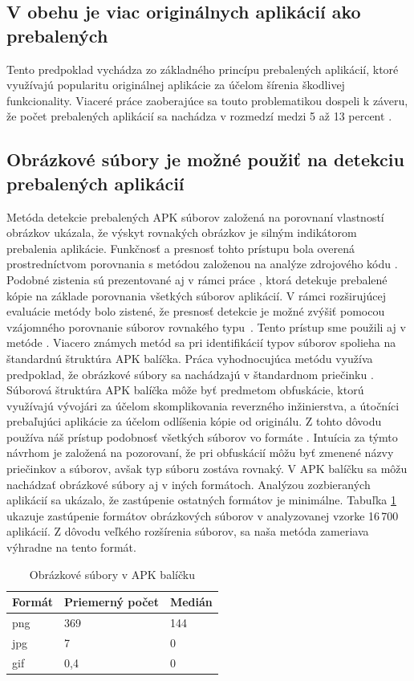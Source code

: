 \subsection*{V obehu je viac originálnych aplikácií ako prebalených}
Tento predpoklad vychádza zo základného princípu prebalených aplikácií, ktoré využívajú popularitu originálnej aplikácie za účelom šírenia škodlivej funkcionality. Viaceré práce zaoberajúce sa touto problematikou dospeli k záveru, že počet prebalených aplikácií sa nachádza v rozmedzí medzi 5 až 13 percent \cite{Zhou2012}.

\subsection*{Obrázkové súbory je možné použiť na detekciu prebalených aplikácií}
Metóda detekcie prebalených APK súborov  založená na porovnaní vlastností obrázkov ukázala, že výskyt rovnakých obrázkov je silným indikátorom prebalenia aplikácie. Funkčnosť a presnosť tohto prístupu bola overená prostredníctvom porovnania s metódou založenou na analýze zdrojového kódu \cite{ImageStruct}. Podobné zistenia sú prezentované aj v rámci práce , ktorá detekuje prebalené kópie na základe porovnania všetkých súborov aplikácií\cite{Zhauniarovich2014}. V rámci rozširujúcej evaluácie metódy  bolo zistené, že presnosť detekcie je možné zvýšiť pomocou vzájomného porovnanie súborov rovnakého typu~\cite{Gadyatskaya2016}. Tento prístup sme použili aj v metóde . Viacero známych metód sa pri identifikácií typov súborov spolieha na štandardnú štruktúra APK balíčka. Práca vyhodnocujúca metódu  využíva predpoklad, že obrázkové súbory sa nachádzajú v štandardnom priečinku . Súborová štruktúra APK balíčka môže byť predmetom obfuskácie, ktorú využívajú vývojári za účelom skomplikovania reverzného inžinierstva, a útočníci prebaľujúci aplikácie za účelom odlíšenia kópie od originálu. Z tohto dôvodu používa náš prístup podobnosť všetkých súborov vo formáte . Intuícia za týmto návrhom je založená na pozorovaní, že pri obfuskácií môžu byť zmenené názvy priečinkov a súborov, avšak typ súboru zostáva rovnaký. V APK balíčku sa môžu nachádzať obrázkové súbory aj v iných formátoch. Analýzou zozbieraných aplikácií sa ukázalo, že zastúpenie ostatných formátov je minimálne. Tabuľka \ref{images-apk} ukazuje zastúpenie formátov obrázkových súborov v analyzovanej vzorke 16\,700 aplikácií. Z dôvodu veľkého rozšírenia  súborov, sa naša metóda zameriava výhradne na tento formát.
\begin{table}[]
\centering
\label{images-apk}
\begin{tabular}{|l|l|l|}
\hline
\textbf{Formát} & \textbf{Priemerný počet}  & \textbf{Medián}         \\ \hline
png             & 369                       & 144         \\
jpg             & 7                         & 0                 \\
gif             & 0,4                       & 0             \\
\hline
\end{tabular}
\caption{Obrázkové súbory v APK balíčku}
\end{table}
